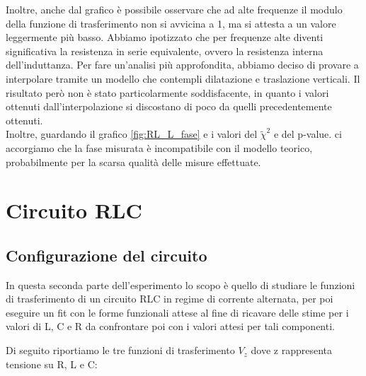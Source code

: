 \documentclass[letterpaper,12pt]{article}
\begin{document}
Inoltre, anche dal grafico è possibile osservare che ad alte frequenze il modulo della funzione di trasferimento non si avvicina a 1, ma si attesta a un valore leggermente più basso. Abbiamo ipotizzato che per frequenze alte diventi significativa la resistenza in serie  equivalente, ovvero la resistenza interna dell'induttanza. Per fare un'analisi più approfondita, abbiamo deciso di provare a interpolare tramite un modello che contempli dilatazione e traslazione verticali. Il risultato però non è stato particolarmente soddisfacente, in quanto i valori ottenuti dall'interpolazione si discostano di poco da quelli precedentemente ottenuti. \\
Inoltre, guardando il grafico \ref{fig:RL_L_fase} e i valori del $\widetilde\chi^2$ e del p-value. ci accorgiamo che la fase misurata è incompatibile con il modello teorico, probabilmente per la scarsa qualità delle misure effettuate.


\section{Circuito RLC}

\subsection{Configurazione del circuito}
In questa seconda parte dell'esperimento lo scopo è quello di studiare le funzioni di trasferimento di un circuito RLC in regime di corrente alternata, per poi eseguire un fit con le forme funzionali attese al fine di ricavare delle stime per i valori di L, C e R da confrontare poi con i valori attesi per tali componenti.

Di seguito riportiamo le tre funzioni di trasferimento $V_z$ dove z rappresenta tensione su R, L e C:
\end{document}
